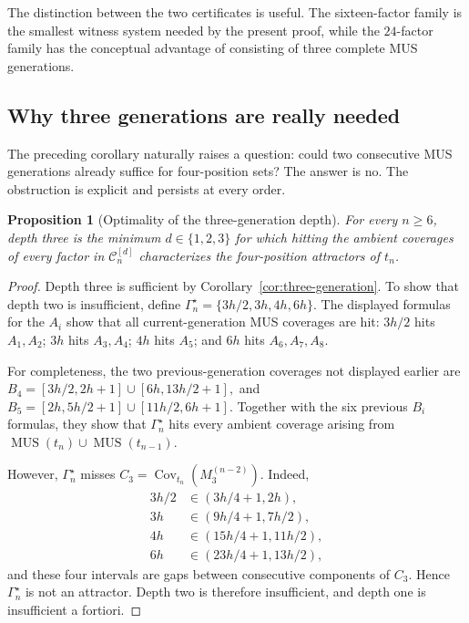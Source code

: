 \documentclass[11pt,a4paper]{article}
\newtheorem{proposition}[theorem]{Proposition}
\theoremstyle{definition}\newtheorem{definition}[theorem]{Definition}
\theoremstyle{remark}\newtheorem{remark}[theorem]{Remark}
\newcommand{\Cov}{\operatorname{Cov}}
\newcommand{\MUS}{\operatorname{MUS}}
\begin{document}
The distinction between the two certificates is useful.  The sixteen-factor family is the smallest witness system needed by the present proof, while the $24$-factor family has the conceptual advantage of consisting of three complete MUS generations.

\subsection{Why three generations are really needed}
\label{subsec:depth-optimality}

The preceding corollary naturally raises a question: could two consecutive MUS generations already suffice for four-position sets?  The answer is no.  The obstruction is explicit and persists at every order.

\begin{proposition}[Optimality of the three-generation depth]
\label{prop:depth-optimality}
For every $n\ge6$, depth three is the minimum $d\in\{1,2,3\}$ for which hitting the ambient coverages of every factor in $\mathcal C_n^{[d]}$ characterizes the four-position attractors of $t_n$.
\end{proposition}

\begin{proof}
Depth three is sufficient by Corollary~\ref{cor:three-generation}.  To show that depth two is insufficient, define
$
 \Gamma_n^\star=\{3h/2,3h,4h,6h\}.
$
The displayed formulas for the $A_i$ show that all current-generation MUS coverages are hit: $3h/2$ hits $A_1,A_2$; $3h$ hits $A_3,A_4$; $4h$ hits $A_5$; and $6h$ hits $A_6,A_7,A_8$.

For completeness, the two previous-generation coverages not displayed earlier are
$
 B_4=[3h/2,2h+1]\cup[6h,13h/2+1],
$
and
$
 B_5=[2h,5h/2+1]\cup[11h/2,6h+1].
$
Together with the six previous $B_i$ formulas, they show that $\Gamma_n^\star$ hits every ambient coverage arising from $\MUS(t_n)\cup\MUS(t_{n-1})$.

However, $\Gamma_n^\star$ misses $C_3=\Cov_{t_n}(M_3^{(n-2)})$.  Indeed,
\begin{align*}
3h/2&\in(3h/4+1,2h),\\
3h&\in(9h/4+1,7h/2),\\
4h&\in(15h/4+1,11h/2),\\
6h&\in(23h/4+1,13h/2),
\end{align*}
and these four intervals are gaps between consecutive components of $C_3$.  Hence $\Gamma_n^\star$ is not an attractor.  Depth two is therefore insufficient, and depth one is insufficient a fortiori.
\end{proof}
\end{document}
